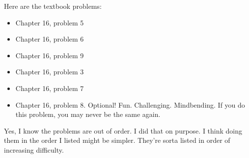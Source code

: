 \documentclass[14pt]{extarticle}
\begin{document}
\noindent Here are the textbook problems:

\begin{itemize}
  \setlength{\itemsep}{-1mm}
  \item Chapter 16, problem 5
  \item Chapter 16, problem 6
  \item Chapter 16, problem 9
  \item Chapter 16, problem 3
  \item Chapter 16, problem 7
  \item Chapter 16, problem 8. Optional!
    Fun. Challenging. Mindbending. If you do this problem, you may
    never be the same again.  
\end{itemize}

Yes, I know the problems are out of order. I did that on purpose. I
think doing them in the order I listed might be simpler. They're
sorta listed in order of increasing difficulty.

\end{document}
